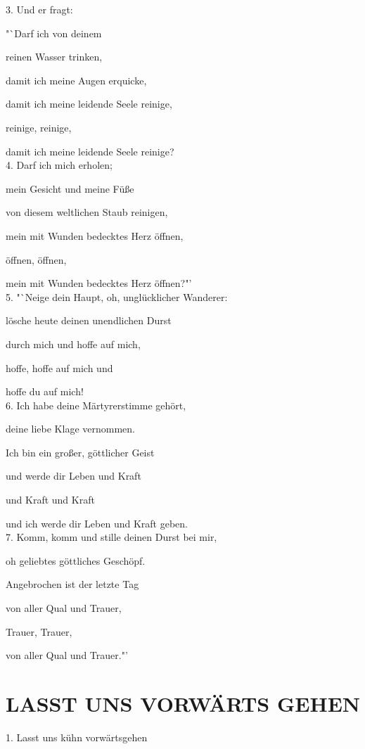 \documentclass[11pt,a5paper,twoside]{article}
\begin{document}
3. Und er fragt: 

"`Darf ich von deinem

reinen Wasser trinken, 

damit ich meine Augen erquicke,

damit ich meine leidende Seele reinige,

reinige, reinige,

damit ich meine leidende Seele reinige?\\

4. Darf ich mich erholen;

mein Gesicht und meine Füße 

von diesem weltlichen Staub reinigen,

mein mit Wunden bedecktes Herz öffnen,

öffnen, öffnen,

mein mit Wunden bedecktes Herz öffnen?"'\\

5. "`Neige dein Haupt, oh, unglücklicher Wanderer: 

lösche heute deinen unendlichen Durst

durch mich und hoffe auf mich,

hoffe, hoffe auf mich und

hoffe du auf mich!\\

6. Ich habe deine Märtyrerstimme gehört,

deine liebe Klage vernommen. 

Ich bin ein großer, göttlicher Geist

und werde dir Leben und Kraft 

und Kraft und Kraft

und ich werde dir Leben und Kraft geben.\\

7. Komm, komm und stille deinen Durst bei mir,

oh geliebtes göttliches Geschöpf. 

Angebrochen ist der letzte Tag

von aller Qual und Trauer,

Trauer, Trauer,

von aller Qual und Trauer."'

\section[Lasst uns vorwärts gehen]{LASST UNS VORWÄRTS GEHEN}

1. Lasst uns kühn vorwärtsgehen
 
\end{document}
